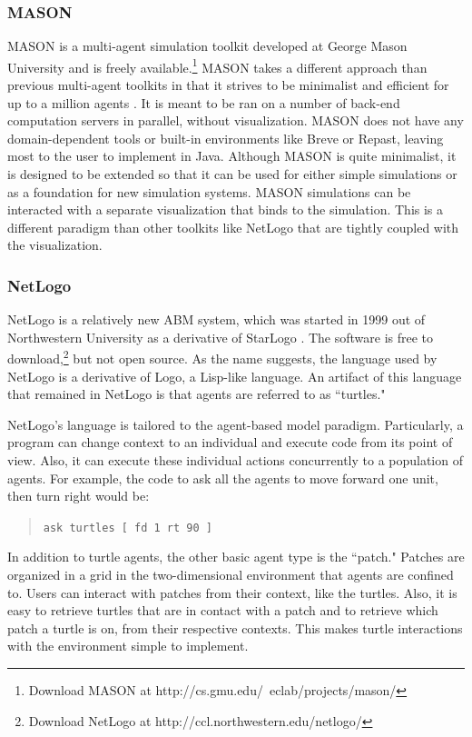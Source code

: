 \subsubsection{MASON}
MASON is a multi-agent simulation toolkit developed at George Mason University and is freely available.\footnote{Download MASON at http://cs.gmu.edu/~eclab/projects/mason/}
MASON takes a different approach than previous multi-agent toolkits in that it strives to be minimalist and efficient for up to a million agents \cite{Luke}.
It is meant to be ran on a number of back-end computation servers in parallel, without visualization.
MASON does not have any domain-dependent tools or built-in environments like Breve or Repast, leaving most to the user to implement in Java.
Although MASON is quite minimalist, it is designed to be extended so that it can be used for either simple simulations or as a foundation for new simulation systems.
MASON simulations can be interacted with a separate visualization that binds to the simulation.
This is a different paradigm than other toolkits like NetLogo that are tightly coupled with the visualization.


\subsubsection{NetLogo}
NetLogo is a relatively new ABM system, which was started in 1999 out of Northwestern University as a derivative of StarLogo \cite{tisue2004netlogo}.
The software is free to download,\footnote{Download NetLogo at http://ccl.northwestern.edu/netlogo/} but not open source.
As the name suggests, the language used by NetLogo is a derivative of Logo, a Lisp-like language.
An artifact of this language that remained in NetLogo is that agents are referred to as ``turtles."

NetLogo's language is tailored to the agent-based model paradigm.
Particularly, a program can change context to an individual and execute code from its point of view.
Also, it can execute these individual actions concurrently to a population of agents.
For example, the code to ask all the agents to move forward one unit, then turn right would be:
\begin{quote}\texttt{\small ask turtles [ fd 1 rt 90 ]}\end{quote}
In addition to turtle agents, the other basic agent type is the ``patch."
Patches are organized in a grid in the two-dimensional environment that agents are confined to.
Users can interact with patches from their context, like the turtles.
Also, it is easy to retrieve turtles that are in contact with a patch and to retrieve which patch a turtle is on, from their respective contexts.
This makes turtle interactions with the environment simple to implement.

